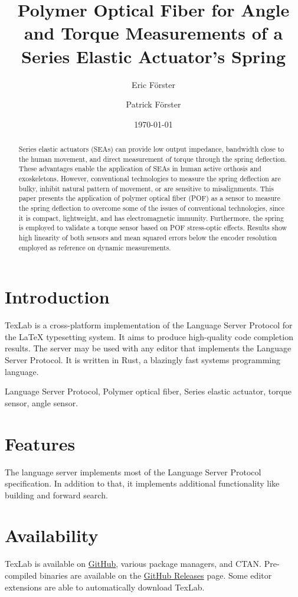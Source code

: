 \documentclass[journal]{IEEEtran}  %
\title{Polymer Optical Fiber for Angle and Torque Measurements of a Series Elastic Actuator’s Spring}
\author{Eric Förster \and Patrick Förster}
\date{\today}
\begin{document}
\maketitle

\begin{abstract}
    Series elastic actuators (SEAs) can provide low output impedance, bandwidth close to the human movement, and direct measurement of torque through the spring deflection. These advantages enable the application of SEAs in human active orthosis and exoskeletons. However, conventional technologies to measure the spring deflection are bulky, inhibit natural pattern of movement, or are sensitive to misalignments. This paper presents the application of polymer optical fiber (POF) as a sensor to measure the spring deflection to overcome some of the issues of conventional technologies, since it is compact, lightweight, and has electromagnetic immunity. Furthermore, the spring is employed to validate a torque sensor based on POF stress-optic effects. Results show high linearity of both sensors and mean squared errors below the encoder resolution employed as reference on dynamic measurements.
\end{abstract}

\section{Introduction}
TexLab is a cross-platform implementation of the Language Server Protocol for the \LaTeX{} typesetting system. It aims to produce high-quality code completion results. The server may be used with any editor that implements the Language Server Protocol. It is written in Rust, a blazingly fast systems programming language.

\begin{IEEEkeywords}
    Language Server Protocol, Polymer optical fiber, Series elastic actuator, torque sensor, angle sensor.
\end{IEEEkeywords}

\section{Features}
The language server implements most of the Language Server Protocol specification. In addition to that, it implements additional functionality like building and forward search.

\section{Availability}
TexLab is available on \href{https://github.com/latex-lsp/texlab}{GitHub}, various package managers, and CTAN. Pre-compiled binaries are available on the \href{https://github.com/latex-lsp/texlab/releases}{GitHub Releases} page. Some editor extensions are able to automatically download TexLab.
\end{document}
